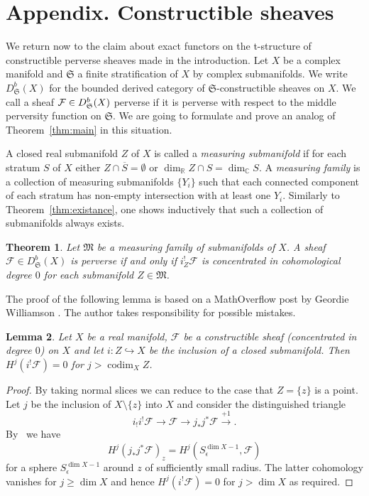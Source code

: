 \documentclass{compositio}
\theoremstyle{plain}
\newtheorem{Thm}{Theorem}
\newtheorem{Lem}[Thm]{Lemma}
\theoremstyle{definition}
\theoremstyle{remark}
\newcommand\sheaf{\mathcal}
\newcommand\codim{\operatorname{codim}}
\newcommand\setset\mathfrak
\newcommand\measuringFam{\mathfrak M}
\begin{document}
\section*{Appendix. Constructible sheaves}

We return now to the claim about exact functors on the t-structure of constructible perverse sheaves made in the introduction.
Let $X$ be a complex manifold and $\setset S$ a finite stratification of $X$ by complex submanifolds.
We write $D^b_{\setset S}(X)$ for the bounded derived category of $\setset S$-constructible sheaves on $X$.
We call a sheaf $\sheaf F \in  \smash[t]{D^b_{\setset S}(X)}$ perverse if it is perverse with respect to the middle perversity function on $\setset S$.
We are going to formulate and prove an analog of Theorem~\ref{thm:main} in this situation.

A closed real submanifold $Z$ of $X$ is called a \emph{measuring submanifold} if for each stratum $S$ of $X$ either $Z \cap  \overline S = \emptyset$ or $\dim_\mathbb{R} Z \cap  S = \dim_\mathbb{C} S$.
A \emph{measuring family} is a collection of measuring submanifolds $\{ Y_i \}$ such that each connected component of each stratum has non-empty intersection with at least one $Y_i$.
Similarly to Theorem~\ref{thm:existance}, one shows inductively that such a collection of submanifolds always exists.

\begin{Thm}
    Let $\measuringFam$ be a measuring family of submanifolds of $X$.
    A sheaf $\sheaf F \in  D^b_{\setset S}(X)$ is perverse if and only if $i_Z^! \sheaf F$ is concentrated in cohomological degree $0$ for each submanifold $Z \in  \measuringFam$.
\end{Thm}

The proof of the following lemma is based on a MathOverflow post by Geordie Williamson \cite{MO:VanishingShriekRestrictionConstructible}.
The author takes responsibility for possible mistakes.

\begin{Lem}\label{lem:constructible_local_vanishing}%
    Let $X$ be a real manifold, $\sheaf F$ be a constructible sheaf (concentrated in degree $0$) on $X$ and let $i\colon Z \hookrightarrow X$ be the inclusion of a closed submanifold.
    Then $H^j(i^!\sheaf F) = 0$ for $j>\codim_XZ$.
\end{Lem}

\begin{proof}
    By taking normal slices we can reduce to the case that $Z = \{z\}$ is a point.
    Let $j$ be the inclusion of $X \setminus \{z\}$ into $X$ and consider the distinguished triangle
    \[
        i_!i^! \sheaf F \to  \sheaf F \to  j_*j^*\sheaf F \xrightarrow{+1}.
    \]
    By~\cite[Lemma~8.4.7]{KashiwaraSchapira:1994:SheavesOnManifolds} we have
    \[
        H^j(j_*j^*\sheaf F)_z = H^j(S^{\dim X - 1}_\epsilon , \sheaf F)
    \]
    for a sphere $S^{\dim X - 1}_\epsilon $ around $z$ of sufficiently small radius.
    The latter cohomology vanishes for $j \ge \dim X$ and hence $H^j(i^! \sheaf F) = 0$ for $j>\dim X$ as required.
\end{proof}
\end{document}
